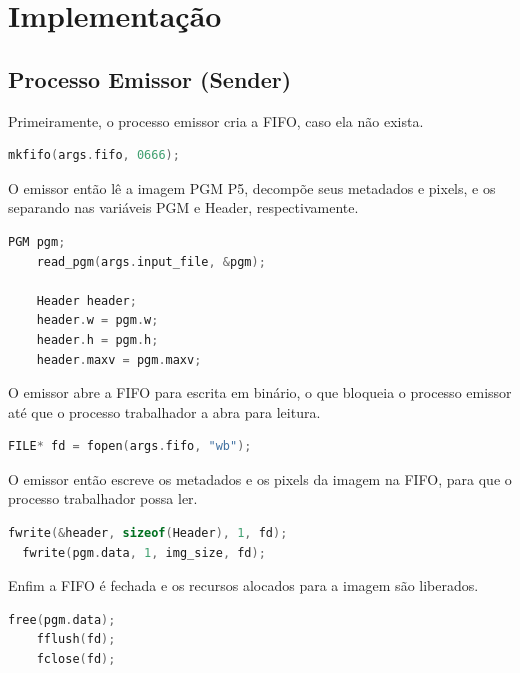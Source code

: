 \documentclass[12 pt]{abntex2}
\begin{document}
\section{Implementação}

\subsection{Processo Emissor (Sender)}

Primeiramente, o processo emissor cria a FIFO, caso ela não exista.

\begin{lstlisting}[language=C]
    mkfifo(args.fifo, 0666);
\end{lstlisting}

O emissor então lê a imagem PGM P5, decompõe seus metadados e pixels, 
e os separando nas variáveis PGM e Header, respectivamente.

\begin{lstlisting}[language=C]
    PGM pgm;
    read_pgm(args.input_file, &pgm);

    Header header;
    header.w = pgm.w;
    header.h = pgm.h;
    header.maxv = pgm.maxv;
\end{lstlisting}

O emissor abre a FIFO para escrita em binário, o que bloqueia o processo emissor até que o 
processo trabalhador a abra para leitura.

\begin{lstlisting}[language=C]
    FILE* fd = fopen(args.fifo, "wb");
\end{lstlisting}

O emissor então escreve os metadados e os pixels da imagem na FIFO, para que o 
processo trabalhador possa ler.

\begin{lstlisting}[language=C]
  fwrite(&header, sizeof(Header), 1, fd);
  fwrite(pgm.data, 1, img_size, fd);
\end{lstlisting}

Enfim a FIFO é fechada e os recursos alocados para a imagem são liberados.

\begin{lstlisting}[language=C]
    free(pgm.data);
    fflush(fd);
    fclose(fd);
\end{lstlisting}  

\end{document}
